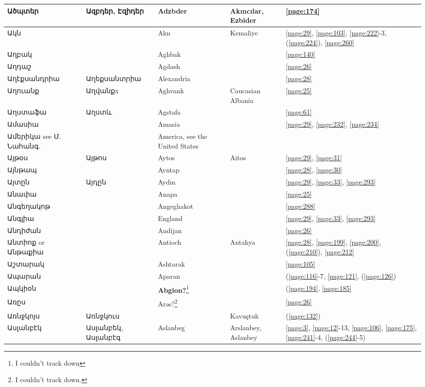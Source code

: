 \begin{center}
\begin{longtable}{|p{}|p{3cm}|p{3cm}|p{2cm}|p{3cm}|}
Ածպտեր& Ազբդեր, Էզիդեր& 
{Adzbder} &Akıncılar, Ezbider &\ref{page:174}\\ \hline
Ակն& &
{Akn}&Kemaliye &\ref{page:29}, \ref{page:103}, \ref{page:222}-3, (\ref{page:224}), \ref{page:260}\\ \hline
Աղբակ& & 
{Aghbak}& &\ref{page:140}\\ \hline
Աղդաշ& & 
{Agdash}& &\ref{page:26}\\ \hline
Աղէքսանդրիա& Աղեքսանտրիա
&{Alexandria}& &\ref{page:28}\\ \hline
Աղուանք& Աղվանքx
& {Aghvank}&Caucasian Albania &\ref{page:25}\\ \hline
Աղստաֆա& Աղստև
& {Agstafa}& &\ref{page:61}\\ \hline
Ամասիա& & 
{Amasia}& &\ref{page:29}, \ref{page:232}, \ref{page:234}\\ \hline
Ամերիկա see Մ. Նահանգ.& &America, see the United States & &\\ \hline
Այթօս&Այթոս & 
{Aytos}& Aitos&\ref{page:29}, \ref{page:31}\\ \hline
Այնթապ& &
Ayntap& &\ref{page:28}, \ref{page:30}\\ \hline
Այտըն& Այդըն 
&{Aydın} & &\ref{page:29}, \ref{page:33}, \ref{page:293}\\ \hline
Անափա & &Anapa & & \ref{page:25} \\\hline 
Անգեղակոթ &   &Angeghakot & & \ref{page:288} \\ \hline 
Անգլիա & &England & & \ref{page:29}, \ref{page:33}, \ref{page:293} \\ \hline 
Անդիժան& & 
{Andijan}& &\ref{page:26}\\ \hline
Անտիոք or Անթաքիա& & 
Antioch& Antakya &\ref{page:28}, \ref{page:199}, \ref{page:200}, (\ref{page:210}), \ref{page:212}\\ \hline
Աշտարակ& & 
{Ashtarak}& &\ref{page:105}\\ \hline
Ապարան& & 
{Aparan}& &(\ref{page:116}-7, \ref{page:121}, (\ref{page:126})\\ \hline
Ապկիօն& &
\textbf{Abgion?}\footnote{I couldn't track down}& &(\ref{page:194}, \ref{page:185}\\ \hline
Առըս& & 
{Arəs?}\footnote{I couldn't track down.}&&\ref{page:26}\\ \hline
Առնջկոյս&Առնջկուս
& {}& Kavuştuk       &(\ref{page:132})\\ \hline
Ասլանբէկ& Ասլանբեկ, Ասլանբէգ& 
{Aslanbeg}&Arslanbey, Aslanbey &\ref{page:3}, \ref{page:12}-13, \ref{page:106}, \ref{page:175}, \ref{page:241}-4, (\ref{page:244}-5)\\ \hline

\end{longtable}
\end{center}
